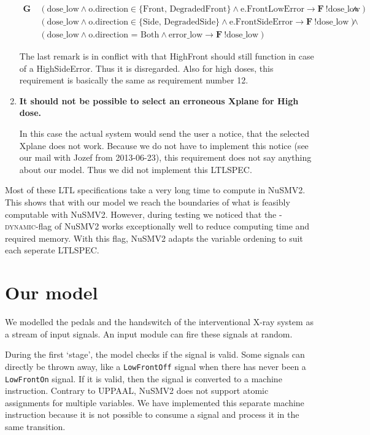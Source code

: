 \documentclass[a4paper,10pt]{article}
\newcommand{\LTLG}{\mathbf{G~}}
\newcommand{\LTLF}{\mathbf{F~}}
\newcommand{\imply}{\rightarrow}
\newcommand{\doselow}{\textrm{dose\_low}}
\newcommand{\errorlow}{\textrm{error\_low}}
\begin{document}
\begin{enumerate}
			\begin{align*}
				\LTLG & (\doselow \land \textrm{o.direction} \in \{\textrm{Front, DegradedFront}\} \land \textrm{e.FrontLowError} \imply \LTLF !\doselow) \land \\
				&  (\doselow \land \textrm{o.direction} \in \{\textrm{Side, DegradedSide}\} \land \textrm{e.FrontSideError} \imply \LTLF !\doselow) \land \\
				& (\doselow \land \textrm{o.direction = Both} \land \errorlow \imply \LTLF !\doselow)
			\end{align*}

			The last remark is in conflict with that HighFront should still function in case of a HighSideError.
			Thus it is disregarded. Also for high doses, this requirement is basically the same as requirement number 12.

		\item \textbf{It should not be possible to select an erroneous Xplane for High dose.}

			In this case the actual system would send the user a notice, that the selected Xplane does not work.
			Because we do not have to implement this notice (see our mail with Jozef from 2013-06-23), this requirement does not say anything about our model.
			Thus we did not implement this LTLSPEC.
	\end{enumerate}
	
	Most of these LTL specifications take a very long time to compute in NuSMV2.
	This shows that with our model we reach the boundaries of what is feasibly computable with NuSMV2.
	However, during testing we noticed that the \textsc{-dynamic}-flag of NuSMV2 works exceptionally well to reduce computing time and required memory.
	With this flag, NuSMV2 adapts the variable ordening to suit each seperate LTLSPEC.
	
	\section{Our model}
	We modelled the pedals and the handswitch of the interventional X-ray system as a stream of input signals.
	An input module can fire these signals at random.
	
	During the first `stage', the model checks if the signal is valid.
	Some signals can directly be thrown away, like a \texttt{LowFrontOff} signal when there has never been a \texttt{LowFrontOn} signal.
	If it is valid, then the signal is converted to a machine instruction.
	Contrary to UPPAAL, NuSMV2 does not support atomic assignments for multiple variables.
	We have implemented this separate machine instruction because it is not possible to consume a signal and process it in the same transition.
	
\end{document}
